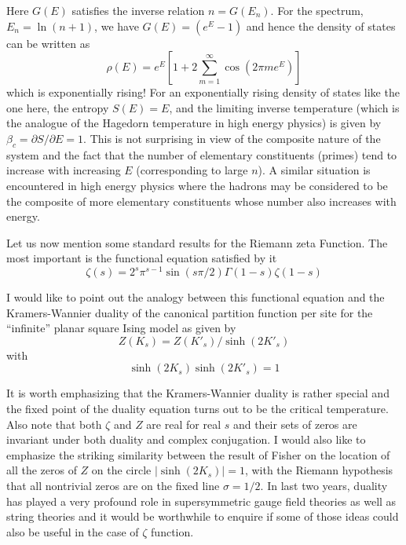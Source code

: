 \documentclass[11pt]{article}
\theoremstyle{plain}
\begin{document}
Here $G(E)$ satisfies the inverse relation $n = G(E_n)$. For the spectrum, $E_n = \ln(n + 1)$, we have $G(E) = (e^E - 1)$ and hence the density of states can be written as
\begin{equation}
\rho(E) = e^E \left[ 1 + 2 \sum_{m=1}^{\infty} \cos(2\pi m e^E) \right]
\label{eq:density_explicit}
\end{equation}
which is exponentially rising! For an exponentially rising density of states like the one here, the entropy $S(E) = E$, and the limiting inverse temperature (which is the analogue of the Hagedorn temperature \cite{hagedorn1965} in high energy physics) is given by $\beta_c = \partial S/\partial E = 1$. This is not surprising in view of the composite nature of the system and the fact that the number of elementary constituents (primes) tend to increase with increasing $E$ (corresponding to large $n$). A similar situation is encountered in high energy physics \cite{hagedorn1965} where the hadrons may be considered to be the composite of more elementary constituents whose number also increases with energy.

Let us now mention some standard results for the Riemann zeta Function. The most important is the functional equation satisfied by it \cite{edwards1974}
\begin{equation}
\zeta(s) = 2^s \pi^{s-1} \sin(s\pi/2) \Gamma(1 - s) \zeta(1 - s)
\label{eq:functional}
\end{equation}

I would like to point out the analogy \cite{julia1994} between this functional equation and the Kramers-Wannier duality of the canonical partition function per site for the ``infinite'' planar square Ising model \cite{kramers1941} as given by
\begin{equation}
Z(K_s) = Z(K'_s)/\sinh(2K'_s)
\label{eq:kramers_wannier}
\end{equation}
with
\begin{equation}
\sinh(2K_s) \sinh(2K'_s) = 1
\label{eq:duality_condition}
\end{equation}

It is worth emphasizing that the Kramers-Wannier duality is rather special and the fixed point of the duality equation turns out to be the critical temperature. Also note that both $\zeta$ and $Z$ are real for real $s$ and their sets of zeros are invariant under both duality and complex conjugation. I would also like to emphasize the striking similarity between the result of Fisher \cite{fisher1965} on the location of all the zeros of $Z$ on the circle $|\sinh(2K_s)| = 1$, with the Riemann hypothesis that all nontrivial zeros are on the fixed line $\sigma = 1/2$. In last two years, duality has played a very profound role in supersymmetric gauge field theories as well as string theories \cite{phystoday1995} and it would be worthwhile to enquire if some of those ideas could also be useful in the case of $\zeta$ function.
\end{document}
